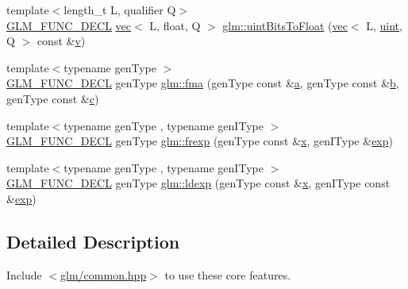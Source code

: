 \begin{DoxyCompactItemize}
\item 
{\footnotesize template$<$length\+\_\+t L, qualifier Q$>$ }\\\hyperlink{setup_8hpp_ab2d052de21a70539923e9bcbf6e83a51}{G\+L\+M\+\_\+\+F\+U\+N\+C\+\_\+\+D\+E\+CL} \hyperlink{structglm_1_1vec}{vec}$<$ L, float, Q $>$ \hyperlink{group__core__func__common_ga97f46b5f7b42fe44482e13356eb394ae}{glm\+::uint\+Bits\+To\+Float} (\hyperlink{structglm_1_1vec}{vec}$<$ L, \hyperlink{group__core__precision_ga4fd29415871152bfb5abd588334147c8}{uint}, Q $>$ const \&\hyperlink{_s_d_l__opengl_8h_a10a82eabcb59d2fcd74acee063775f90}{v})
\item 
{\footnotesize template$<$typename gen\+Type $>$ }\\\hyperlink{setup_8hpp_ab2d052de21a70539923e9bcbf6e83a51}{G\+L\+M\+\_\+\+F\+U\+N\+C\+\_\+\+D\+E\+CL} gen\+Type \hyperlink{group__core__func__common_gad0f444d4b81cc53c3b6edf5aa25078c2}{glm\+::fma} (gen\+Type const \&\hyperlink{_s_d_l__opengl__glext_8h_a3309789fc188587d666cda5ece79cf82}{a}, gen\+Type const \&\hyperlink{_s_d_l__opengl__glext_8h_a0f71581a41fd2264c8944126dabbd010}{b}, gen\+Type const \&\hyperlink{_s_d_l__opengl__glext_8h_a1f2d7f8147412c43ba2303a56f97ee73}{c})
\item 
{\footnotesize template$<$typename gen\+Type , typename gen\+I\+Type $>$ }\\\hyperlink{setup_8hpp_ab2d052de21a70539923e9bcbf6e83a51}{G\+L\+M\+\_\+\+F\+U\+N\+C\+\_\+\+D\+E\+CL} gen\+Type \hyperlink{group__core__func__common_ga20620e83544d1a988857a3bc4ebe0e1d}{glm\+::frexp} (gen\+Type const \&\hyperlink{_s_d_l__opengl_8h_ad0e63d0edcdbd3d79554076bf309fd47}{x}, gen\+I\+Type \&\hyperlink{group__core__func__exponential_ga071566cadc7505455e611f2a0353f4d4}{exp})
\item 
{\footnotesize template$<$typename gen\+Type , typename gen\+I\+Type $>$ }\\\hyperlink{setup_8hpp_ab2d052de21a70539923e9bcbf6e83a51}{G\+L\+M\+\_\+\+F\+U\+N\+C\+\_\+\+D\+E\+CL} gen\+Type \hyperlink{group__core__func__common_ga52e319d7289b849ec92055abd4830533}{glm\+::ldexp} (gen\+Type const \&\hyperlink{_s_d_l__opengl_8h_ad0e63d0edcdbd3d79554076bf309fd47}{x}, gen\+I\+Type const \&\hyperlink{group__core__func__exponential_ga071566cadc7505455e611f2a0353f4d4}{exp})
\end{DoxyCompactItemize}


\subsection{Detailed Description}
Include $<$\hyperlink{common_8hpp}{glm/common.\+hpp}$>$ to use these core features.

